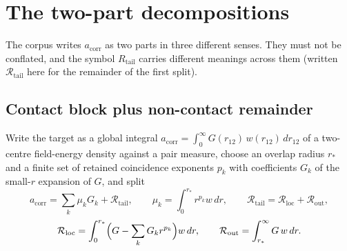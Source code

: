 \documentclass[aps,prd,onecolumn,amsmath,amssymb,longbibliography,floatfix,nofootinbib]{revtex4-2}
\newcommand{\acorr}{a_{\mathrm{corr}}}
\newcommand{\Rtail}{\mathcal{R}_{\mathrm{tail}}}
\begin{document}
\section{The two-part decompositions}
The corpus writes $\acorr$ as two parts in three different senses. They must not be conflated, and the symbol $R_{\mathrm{tail}}$ carries different meanings across them (written $\Rtail$ here for the remainder of the first split).

\subsection{Contact block plus non-contact remainder}
Write the target as a global integral $\acorr=\int_0^\infty G(r_{12})\,w(r_{12})\,dr_{12}$ of a two-centre field-energy density against a pair measure, choose an overlap radius $r_*$ and a finite set of retained coincidence exponents $p_k$ with coefficients $G_k$ of the small-$r$ expansion of $G$, and split
\begin{equation}
\acorr=\sum_k\mu_kG_k+\Rtail,\qquad \mu_k=\int_0^{r_*}r^{p_k}w\,dr,\qquad \Rtail=\mathcal{R}_{\mathrm{loc}}+\mathcal{R}_{\mathrm{out}},
\end{equation}
\begin{equation}
\mathcal{R}_{\mathrm{loc}}=\int_0^{r_*}\Bigl(G-\sum_kG_kr^{p_k}\Bigr)w\,dr,\qquad \mathcal{R}_{\mathrm{out}}=\int_{r_*}^{\infty}G\,w\,dr .
\end{equation}
\end{document}
